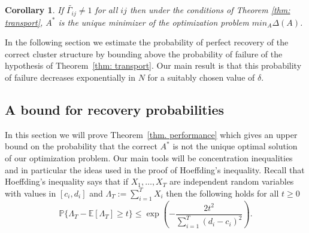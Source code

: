\documentclass[12pt]{amsart}
\newtheorem{cor}[lemma]{Corollary}
\theoremstyle{remark}
\newcommand{\PP}{\mathbb{P}}
\newcommand{\EE}{\mathbb{E}}
\begin{document}
\begin{cor}\label{cor: uniqueness}
If $\widetilde{\Gamma_{ij}}\neq 1$ for all $ij$ then under the conditions of Theorem \ref{thm: transport}, $A^*$ is the unique minimizer of the optimization problem $min_A\Delta (A)$.
\end{cor}

In the following section we estimate the probability of perfect recovery of the correct cluster structure by bounding above the probability of failure of the hypothesis of Theorem~\ref{thm: transport}. Our main result is that this probability of failure decreases exponentially in $N$ for a suitably chosen value of $\delta$.


\subsection{A bound for recovery probabilities}
\label{Sec: probabilistic}
In this section we will prove Theorem~\ref{thm. performance} which gives an upper bound on the probability that the correct $A^*$ is not the unique optimal solution of our optimization problem. Our main tools will be concentration inequalities and in particular the ideas used in the proof of Hoeffding's inequality. Recall that Hoeffding's inequality says that if $X_1,\dots, X_T$ are independent random variables with values in $[c_i,d_i]$ and $\Lambda_T:=\sum_{i=1}^T X_i$ then the following holds for all $t\geq 0$ 
\[\PP\{\Lambda_T-\EE[\Lambda_T]\geq t\}\leq \exp\left(-\frac{2t^2}{\sum_{i=1}^T (d_i-c_i)^2}\right).\]
\end{document}
